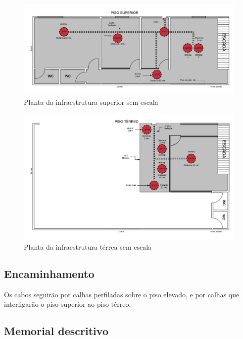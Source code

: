 \documentclass[	DIV=calc,%
							paper=a4,%
							fontsize=12pt,%
							onecolumn]{scrartcl}	 					%
\begin{document}
\begin{figure}[H]
	\centering
	\includegraphics[width=\textwidth]{InfraestruturaSuperior}
	\caption{Planta da infraestrutura superior sem escala}
	\label{fig4}
\end{figure}

\begin{figure}[H]
	\centering
	\includegraphics[width=\textwidth]{InfraestruturaTerreo}
	\caption{Planta da infraestrutura térrea sem escala}
	\label{fig3}
\end{figure}


\subsection{Encaminhamento}
Os cabos seguirão por calhas perfiladas sobre o piso elevado, e por calhas que interligarão o piso superior ao piso térreo. 

\subsection{Memorial descritivo}
\end{document}
